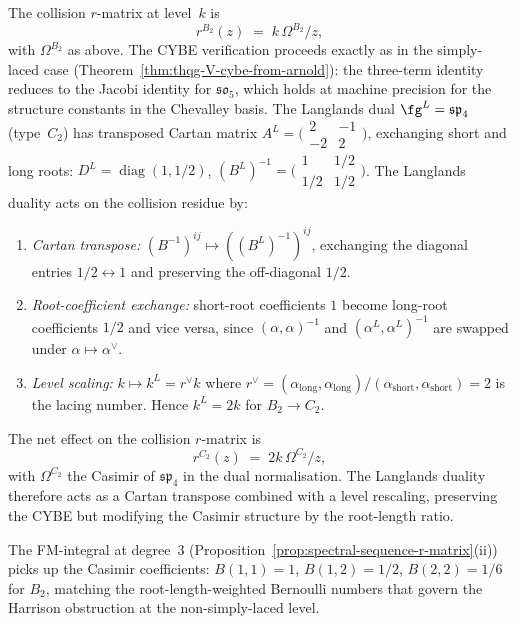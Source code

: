 \begin{computation}
The collision $r$-matrix at level~$k$ is
\begin{equation}\label{eq:B2-r-matrix}
 r^{B_2}(z) \;=\; k\,\Omega^{B_2}/z,
\end{equation}
with $\Omega^{B_2}$ as above. The CYBE verification proceeds
exactly as in the simply-laced case
(Theorem~\ref{thm:thqg-V-cybe-from-arnold}): the three-term identity
reduces to the Jacobi identity for $\mathfrak{so}_5$, which
holds at machine precision for the structure constants
in the Chevalley basis.
The Langlands dual $\fg^L = \mathfrak{sp}_4$ (type~$C_2$)
has transposed Cartan matrix
$A^L = \bigl(\begin{smallmatrix} 2 & -1 \\ -2 & 2
\end{smallmatrix}\bigr)$,
exchanging short and long roots: $D^L = \operatorname{diag}(1, 1/2)$,
$(B^L)^{-1} = \bigl(\begin{smallmatrix} 1 & 1/2 \\
1/2 & 1/2 \end{smallmatrix}\bigr)$.
The Langlands duality acts on the collision residue by:
\begin{enumerate}[label=\textup{(\roman*)}]
\item \emph{Cartan transpose:} $(B^{-1})^{ij} \mapsto
 ((B^L)^{-1})^{ij}$, exchanging the diagonal entries
 $1/2 \leftrightarrow 1$ and preserving the off-diagonal
 $1/2$.
\item \emph{Root-coefficient exchange:} short-root
 coefficients $1$ become long-root coefficients $1/2$
 and vice versa, since $(\alpha,\alpha)^{-1}$ and
 $(\alpha^L, \alpha^L)^{-1}$ are swapped under
 $\alpha \mapsto \alpha^\vee$.
\item \emph{Level scaling:} $k \mapsto k^L = r^\vee k$
 where $r^\vee = (\alpha_{\mathrm{long}},
 \alpha_{\mathrm{long}})/(\alpha_{\mathrm{short}},
 \alpha_{\mathrm{short}}) = 2$ is the lacing number.
 Hence $k^L = 2k$ for $B_2 \to C_2$.
\end{enumerate}
The net effect on the collision $r$-matrix is
\begin{equation}\label{eq:langlands-r-matrix}
 r^{C_2}(z)
 \;=\;
 2k\,\Omega^{C_2}/z,
\end{equation}
with $\Omega^{C_2}$ the Casimir of $\mathfrak{sp}_4$ in
the dual normalisation. The Langlands duality therefore
acts as a Cartan transpose combined with a level rescaling,
preserving the CYBE but modifying the Casimir structure
by the root-length ratio.

The FM-integral at degree~$3$
(Proposition~\ref{prop:spectral-sequence-r-matrix}(ii))
picks up the Casimir coefficients:
$B(1,1) = 1$, $B(1,2) = 1/2$, $B(2,2) = 1/6$ for $B_2$,
matching the root-length-weighted Bernoulli numbers
that govern the Harrison obstruction at the non-simply-laced
level.
\end{computation}

